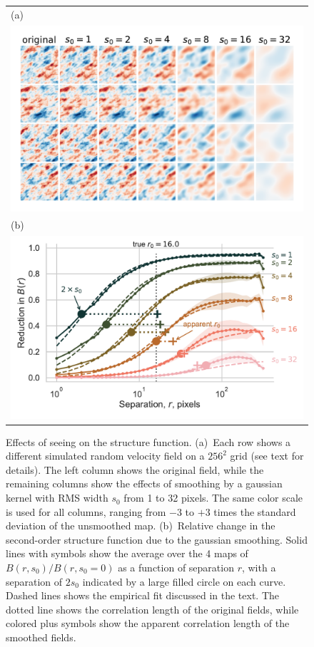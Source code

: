 \documentclass[fleqn,usenatbib, useAMS, a4paper]{mnras}
\begin{document}
\begin{figure}
  \begin{tabular}{@{} l @{}}
    (a)\\
    \includegraphics[width=\linewidth]{Figures/fake-seeing-nonp-thumbnails}\\
    (b)\\
    \includegraphics[width=\linewidth]{Figures/fake-seeing-nonp-reduction}
  \end{tabular}
  \caption{Effects of seeing on the structure function.
    (a)~Each row shows a different simulated random velocity field
    on a \(256^2\) grid (see text for details).
    The left column shows the original field,
    while the remaining columns show the effects of smoothing by a gaussian kernel
    with RMS width \(s_0\) from 1 to 32 pixels.
    The same color scale is used for all columns, ranging from \(-3\) to \(+3\) times
    the standard deviation of the unsmoothed map.
    (b)~Relative change in the second-order structure function due to the gaussian smoothing.
    Solid lines with symbols show the average over the 4 maps of
    \(B(r, s_0) / B(r, s_0 = 0)\) as a function of separation \(r\),
    with a separation of \(2 s_0\) indicated by a large filled circle on each curve.
    Dashed lines shows the empirical fit discussed in the text.
    The dotted line shows the correlation length of the original fields,
    while colored plus symbols show the apparent correlation length of the smoothed fields.
  }
  \label{fig:seeing-reduction}
\end{figure}
\end{document}
